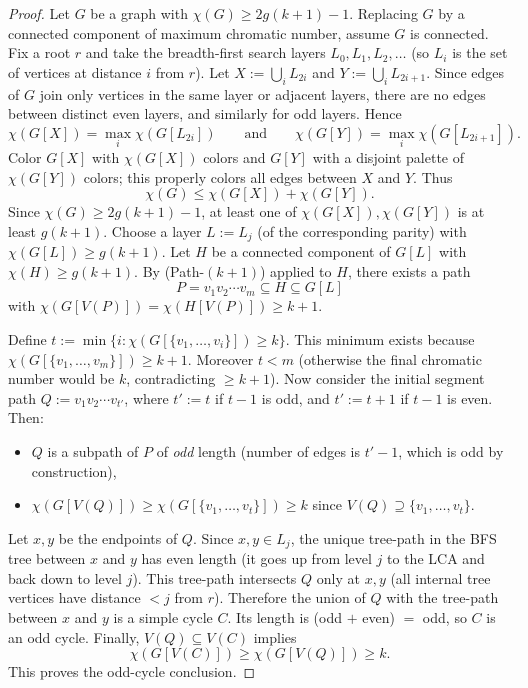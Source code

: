 \begin{proof}
Let $G$ be a graph with $\chi(G)\ge 2g(k+1)-1$.
Replacing $G$ by a connected component of maximum chromatic number, assume $G$ is connected.
Fix a root $r$ and take the breadth-first search layers $L_0, L_1, L_2,\dots$ (so $L_i$ is the set of vertices at distance $i$ from $r$).
Let $X:=\bigcup_i L_{2i}$ and $Y:=\bigcup_i L_{2i+1}$.
Since edges of $G$ join only vertices in the same layer or adjacent layers, there are no edges between distinct even layers, and similarly for odd layers.
Hence
\[
  \chi(G[X]) = \max_i \chi(G[L_{2i}])\qquad\text{and}\qquad
  \chi(G[Y]) = \max_i \chi(G[L_{2i+1}]).
\]
Color $G[X]$ with $\chi(G[X])$ colors and $G[Y]$ with a disjoint palette of $\chi(G[Y])$ colors; this properly colors all edges between $X$ and $Y$.
Thus
\[
  \chi(G)\le \chi(G[X]) + \chi(G[Y]).
\]
Since $\chi(G)\ge 2g(k+1)-1$, at least one of $\chi(G[X]),\chi(G[Y])$ is at least $g(k+1)$.
Choose a layer $L:=L_j$ (of the corresponding parity) with
$\chi(G[L])\ge g(k+1)$.
Let $H$ be a connected component of $G[L]$ with $\chi(H)\ge g(k+1)$.
By (Path-$(k+1)$) applied to $H$, there exists a path
\[P=v_1v_2\cdots v_m\subseteq H\subseteq G[L]\]
with $\chi(G[V(P)])=\chi(H[V(P)])\ge k+1$.

Define $t:=\min\{i: \chi(G[\{v_1,\dots,v_i\}])\ge k\}$.
This minimum exists because $\chi(G[\{v_1,\dots,v_m\}])\ge k+1$.
Moreover $t<m$ (otherwise the final chromatic number would be $k$, contradicting $\ge k+1$).
Now consider the initial segment path $Q:=v_1v_2\cdots v_{t'}$, where $t':=t$ if $t-1$ is odd, and $t':=t+1$ if $t-1$ is even.
Then:
\begin{itemize}
\item $Q$ is a subpath of $P$ of \emph{odd} length (number of edges is $t'-1$, which is odd by construction),
\item $\chi(G[V(Q)])\ge \chi(G[\{v_1,\dots,v_t\}])\ge k$ since $V(Q)\supseteq\{v_1,\dots,v_t\}$.
\end{itemize}
Let $x,y$ be the endpoints of $Q$.
Since $x,y\in L_j$, the unique tree-path in the BFS tree between $x$ and $y$ has even length (it goes up from level $j$ to the LCA and back down to level $j$).
This tree-path intersects $Q$ only at $x,y$ (all internal tree vertices have distance $<j$ from $r$).
Therefore the union of $Q$ with the tree-path between $x$ and $y$ is a simple cycle $C$.
Its length is (odd $+$ even) $=$ odd, so $C$ is an odd cycle.
Finally, $V(Q)\subseteq V(C)$ implies
\[
  \chi(G[V(C)])\ge \chi(G[V(Q)])\ge k.
\]
This proves the odd-cycle conclusion.
\end{proof}


